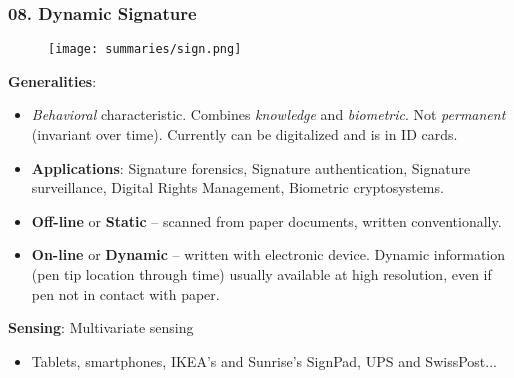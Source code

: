 \documentclass[a4paper]{article}
\begin{document}
    \subsubsection*{08. Dynamic Signature}
      \begin{figure}[htp]
        \centering
          \texttt{[image: summaries/sign.png]}
      \end{figure}
      \textbf{Generalities}:
      \begin{itemize}
        \item \emph{Behavioral} characteristic. Combines \emph{knowledge} and \emph{biometric}. Not \emph{permanent} (invariant over time). Currently can be digitalized and is in ID cards.
        \item \textbf{Applications}: Signature forensics, Signature authentication, Signature surveillance, Digital Rights Management, Biometric cryptosystems.
        \item \textbf{Off-line} or \textbf{Static} -- scanned from paper documents, written conventionally.
        \item \textbf{On-line} or \textbf{Dynamic} -- written with electronic device. Dynamic information (pen tip location through time) usually available at high resolution, even if pen not in contact with paper.
      \end{itemize}

      \textbf{Sensing}: Multivariate sensing
      \begin{itemize}
        \item Tablets, smartphones, IKEA's and Sunrise's SignPad, UPS and SwissPost...
      \end{itemize}
\end{document}
